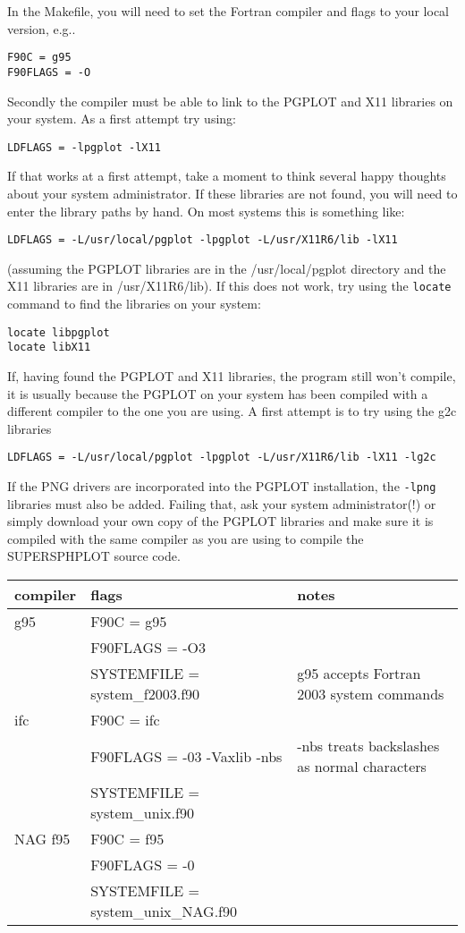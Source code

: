 \documentclass[a4paper,11pt]{article}
\begin{document}
 In the Makefile, you will need to set the Fortran compiler and flags to your local version, e.g..
\begin{verbatim}
F90C = g95
F90FLAGS = -O
\end{verbatim}
 Secondly the compiler must be able to link to the PGPLOT and X11 libraries on
your system. As a first attempt try using:
\begin{verbatim}
LDFLAGS = -lpgplot -lX11
\end{verbatim}
If that works at a first attempt, take a moment to think several happy thoughts about your system
administrator. If these libraries are not found, you will need to enter the
library paths by hand. On most systems this is something like:
\begin{verbatim}
LDFLAGS = -L/usr/local/pgplot -lpgplot -L/usr/X11R6/lib -lX11
\end{verbatim}
(assuming the PGPLOT libraries are in the /usr/local/pgplot directory and the
X11 libraries are in /usr/X11R6/lib). If this does not work, try using the
\verb+locate+ command to find the libraries on your system:
\begin{verbatim}
locate libpgplot
locate libX11
\end{verbatim}
 If, having found the PGPLOT and X11
libraries, the program still won't compile, it is usually
because the PGPLOT on your system has been compiled with a different compiler to
the one you are using. A first attempt is to try using the g2c libraries
\begin{verbatim}
LDFLAGS = -L/usr/local/pgplot -lpgplot -L/usr/X11R6/lib -lX11 -lg2c
\end{verbatim}
If the PNG drivers are incorporated into the PGPLOT installation, the \verb+-lpng+ libraries must also be added.
Failing that, ask your system administrator(!) or simply download your own copy of
the PGPLOT libraries and make sure it is compiled with the same compiler as you
are using to compile the SUPERSPHPLOT source code.

\begin{table}
\begin{center}
\begin{tabular}{|l|l|p{}|}
\hline
compiler & flags & notes \\
\hline
g95 & F90C = g95 & \\
    & F90FLAGS = -O3 & \\ 
    & SYSTEMFILE = system\_f2003.f90 & g95 accepts Fortran 2003 system commands\\
\hline
ifc & F90C = ifc & \\
    & F90FLAGS = -03 -Vaxlib -nbs & -nbs treats backslashes as normal characters\\
    & SYSTEMFILE = system\_unix.f90 & \\
\hline
NAG f95 & F90C = f95 & \\
        & F90FLAGS = -0  & \\
        & SYSTEMFILE = system\_unix\_NAG.f90 & \\
\hline
\end{tabular}
\end{center}
\end{table}
\end{document}
